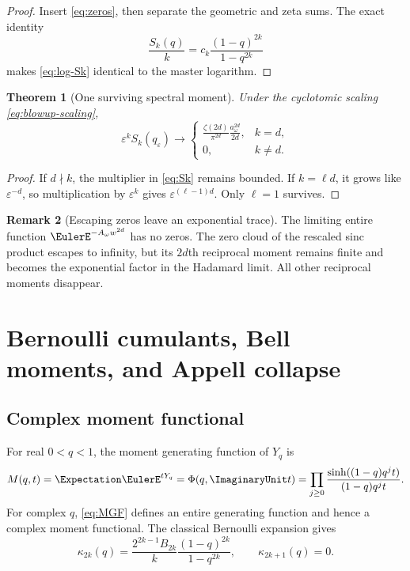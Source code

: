 \documentclass[11pt]{article}
\newtheorem{theorem}{Theorem}[section]
\theoremstyle{definition}
\newtheorem{remark}[theorem]{Remark}
\newcommand{\eps}{\varepsilon}
\begin{document}
\begin{proof}
Insert \cref{eq:zeros}, then separate the geometric and zeta sums.  The exact
identity
\[
 \frac{S_k(q)}{k}
 =c_k\frac{(1-q)^{2k}}{1-q^{2k}}
\]
makes \cref{eq:log-Sk} identical to the master logarithm.
\end{proof}

\begin{theorem}[One surviving spectral moment]
Under the cyclotomic scaling \cref{eq:blowup-scaling},
\begin{equation}
 \eps^kS_k(q_\eps)\longrightarrow
 \begin{cases}
 \displaystyle
 \frac{\zeta(2d)}{\pi^{2d}}
 \frac{a_\omega^{2d}}{2d},&k=d,\\[7pt]
 0,&k\ne d.
 \end{cases}
 \label{eq:spectral-collapse}
\end{equation}
\end{theorem}

\begin{proof}
If $d\nmid k$, the multiplier in \cref{eq:Sk} remains bounded.  If $k=\ell d$, it grows like $\eps^{-d}$, so multiplication by $\eps^k$ gives $\eps^{(\ell-1)d}$.  Only $\ell=1$ survives.
\end{proof}

\begin{remark}[Escaping zeros leave an exponential trace]
The limiting entire function $\EulerE^{-A_\omega w^{2d}}$ has no zeros.  The zero cloud of the rescaled sinc product escapes to infinity, but its $2d$th reciprocal moment remains finite and becomes the exponential factor in the Hadamard limit.  All other reciprocal moments disappear.
\end{remark}

\section{Bernoulli cumulants, Bell moments, and Appell collapse}
\label{sec:bell-collapse}

\subsection{Complex moment functional}

For real $0<q<1$, the moment generating function of $Y_q$ is
\begin{equation}
 M(q,t)=\Expectation\EulerE^{tY_q}
 =\Phi(q,\ImaginaryUnit t)
 =\prod_{j\ge0}
 \frac{\sinh((1-q)q^jt)}{(1-q)q^jt}.
 \label{eq:MGF}
\end{equation}
For complex $q$, \cref{eq:MGF} defines an entire generating function and hence a complex moment functional.  The classical Bernoulli expansion gives
\begin{equation}
 \kappa_{2k}(q)
 =\frac{2^{2k-1}B_{2k}}{k}
 \frac{(1-q)^{2k}}{1-q^{2k}},
 \qquad
 \kappa_{2k+1}(q)=0.
 \label{eq:cumulants}
\end{equation}
\end{document}
